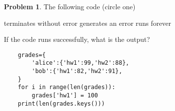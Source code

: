 \documentclass[10pt]{article}
\theoremstyle{definition}
\newtheorem{problem}{Problem}
\begin{document}
\begin{problem}
    The following code (circle one)

    \vspace{0.25in}
    \hspace{0.5in}terminates without error 
    \hspace{1in}generates an error
    \hspace{1in}runs forever
    \vspace{0.25in}

    \noindent
    If the code runs successfully, what is the output?
\end{problem}
\begin{lstlisting}
    grades={
        'alice':{'hw1':99,'hw2':88},
        'bob':{'hw1':82,'hw2':91},
    }
    for i in range(len(grades)):
        grades['hw1'] = 100
    print(len(grades.keys()))
\end{lstlisting}
\vspace{1.5in}
\end{document}
